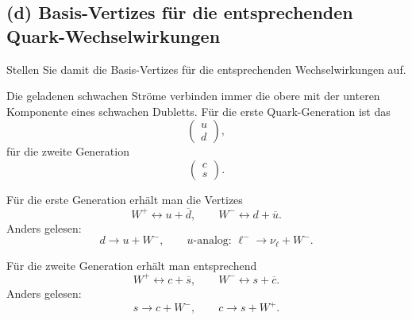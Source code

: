 \documentclass[11pt,a4paper]{scrartcl}
\begin{document}
\subsection*{(d) Basis-Vertizes für die entsprechenden Quark-Wechselwirkungen}

Stellen Sie damit die Basis-Vertizes für die entsprechenden Wechselwirkungen auf.

\begin{calculationbox}
Die geladenen schwachen Ströme verbinden immer die obere mit der unteren Komponente eines schwachen Dubletts. Für die erste Quark-Generation ist das
\[
\begin{pmatrix}u\\ d\end{pmatrix},
\]
für die zweite Generation
\[
\begin{pmatrix}c\\ s\end{pmatrix}.
\]

\begin{calculationbox}
Für die erste Generation erhält man die Vertizes
\[
W^+ \leftrightarrow u+\overline d,
\qquad
W^- \leftrightarrow d+\overline u.
\]
Anders gelesen:
\[
d \to u + W^-,
\qquad
u\text{-analog: } \ell^- \to \nu_\ell+W^-.
\]
\end{calculationbox}

\begin{calculationbox}
Für die zweite Generation erhält man entsprechend
\[
W^+ \leftrightarrow c+\overline s,
\qquad
W^- \leftrightarrow s+\overline c.
\]
Anders gelesen:
\[
s \to c + W^-,
\qquad
c \to s + W^+.
\]
\end{calculationbox}

\begin{center}
\end{center}
\end{calculationbox}
\end{document}

